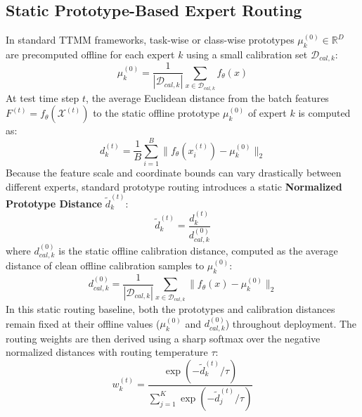 \documentclass{article}
\theoremstyle{plain}
\theoremstyle{definition}
\theoremstyle{remark}
\begin{document}
\subsection{Static Prototype-Based Expert Routing}
In standard TTMM frameworks, task-wise or class-wise prototypes $\mu_k^{(0)} \in \mathbb{R}^D$ are precomputed offline for each expert $k$ using a small calibration set $\mathcal{D}_{cal, k}$:
\begin{equation}
    \mu_k^{(0)} = \frac{1}{|\mathcal{D}_{cal, k}|} \sum_{x \in \mathcal{D}_{cal, k}} f_\theta(x)
\end{equation}
At test time step $t$, the average Euclidean distance from the batch features $F^{(t)} = f_\theta(\mathcal{X}^{(t)})$ to the static offline prototype $\mu_k^{(0)}$ of expert $k$ is computed as:
\begin{equation}
    d_k^{(t)} = \frac{1}{B} \sum_{i=1}^B \| f_\theta(x_i^{(t)}) - \mu_k^{(0)} \|_2
\end{equation}
Because the feature scale and coordinate bounds can vary drastically between different experts, standard prototype routing introduces a static \textbf{Normalized Prototype Distance} $\tilde{d}_k^{(t)}$:
\begin{equation}
    \tilde{d}_k^{(t)} = \frac{d_k^{(t)}}{d_{cal, k}^{(0)}}
\end{equation}
where $d_{cal, k}^{(0)}$ is the static offline calibration distance, computed as the average distance of clean offline calibration samples to $\mu_k^{(0)}$:
\begin{equation}
    d_{cal, k}^{(0)} = \frac{1}{|\mathcal{D}_{cal, k}|} \sum_{x \in \mathcal{D}_{cal, k}} \| f_\theta(x) - \mu_k^{(0)} \|_2
\end{equation}
In this static routing baseline, both the prototypes and calibration distances remain fixed at their offline values ($\mu_k^{(0)}$ and $d_{cal, k}^{(0)}$) throughout deployment. The routing weights are then derived using a sharp softmax over the negative normalized distances with routing temperature $\tau$:
\begin{equation}
    w_k^{(t)} = \frac{\exp(-\tilde{d}_k^{(t)} / \tau)}{\sum_{j=1}^K \exp(-\tilde{d}_j^{(t)} / \tau)}
\end{equation}
\end{document}
